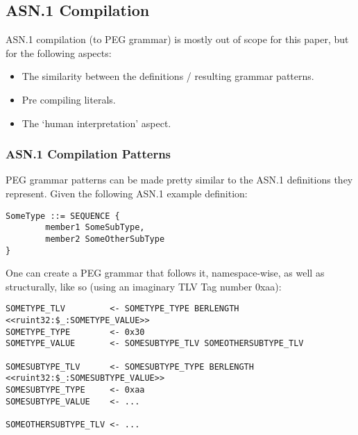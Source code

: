 \subsection{ASN.1 Compilation}

ASN.1 compilation (to PEG grammar) is mostly out of scope for this paper, 
but for the following aspects:
\begin{itemize}
    \item The similarity between the definitions / resulting grammar 
patterns.
    \item Pre compiling literals.
    \item The ‘human interpretation’ aspect.
\end{itemize}

\subsubsection{ASN.1 Compilation Patterns}

PEG grammar patterns can be made pretty similar to the ASN.1 definitions 
they represent. Given the following ASN.1 example definition:

\begin{changemargin}{-60mm}{0mm}
\begin{myquote}
\begin{verbatim}
SomeType ::= SEQUENCE {
        member1 SomeSubType,
        member2 SomeOtherSubType
}
\end{verbatim}
\end{myquote}
\end{changemargin}

One can create a PEG grammar that follows it, namespace-wise, as well as 
structurally, like so (using an imaginary TLV Tag number 0xaa):

\begin{changemargin}{-60mm}{0mm}
\begin{myquote}
\begin{verbatim}
SOMETYPE_TLV         <- SOMETYPE_TYPE BERLENGTH <<ruint32:$_:SOMETYPE_VALUE>>
SOMETYPE_TYPE        <- 0x30
SOMETYPE_VALUE       <- SOMESUBTYPE_TLV SOMEOTHERSUBTYPE_TLV

SOMESUBTYPE_TLV      <- SOMESUBTYPE_TYPE BERLENGTH <<ruint32:$_:SOMESUBTYPE_VALUE>>
SOMESUBTYPE_TYPE     <- 0xaa
SOMESUBTYPE_VALUE    <- ... 

SOMEOTHERSUBTYPE_TLV <- ... 
\end{verbatim}
\end{myquote}
\end{changemargin}

